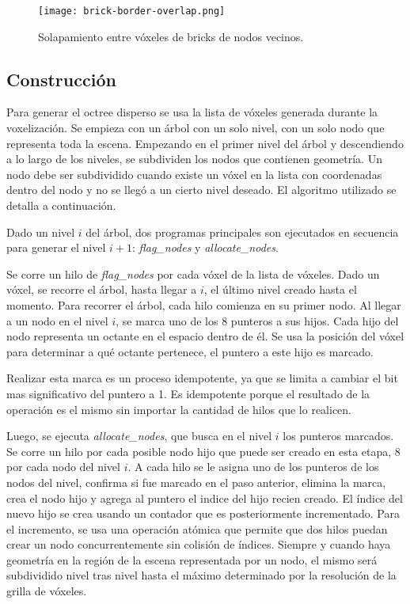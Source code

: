 \begin{figure}[h!]
    \centering
    \texttt{[image: brick-border-overlap.png]}
    \caption{Solapamiento entre vóxeles de bricks de nodos vecinos.}
    \label{fig:brick_border_overlap}
\end{figure}

\subsection{Construcción}\label{design:svo_construction}

Para generar el octree disperso se usa la lista de vóxeles generada durante la voxelización.
Se empieza con un árbol con un solo nivel, con un solo nodo que representa toda la escena.
Empezando en el primer nivel del árbol y descendiendo a lo largo de los niveles, se subdividen los nodos que contienen geometría.
Un nodo debe ser subdividido cuando existe un vóxel en la lista con coordenadas dentro del nodo y no se llegó a un cierto nivel deseado.
El algoritmo utilizado se detalla a continuación.

Dado un nivel $i$ del árbol, dos programas principales son ejecutados en secuencia para generar el nivel $i + 1$: \textit{flag\_nodes} y \textit{allocate\_nodes}.

Se corre un hilo de \textit{flag\_nodes} por cada vóxel de la lista de vóxeles.
Dado un vóxel, se recorre el árbol, hasta llegar a $i$, el último nivel creado hasta el momento.
Para recorrer el árbol, cada hilo comienza en su primer nodo.
Al llegar a un nodo en el nivel $i$, se marca uno de los $8$ punteros a sus hijos.
Cada hijo del nodo representa un octante en el espacio dentro de él.
Se usa la posición del vóxel para determinar a qué octante pertenece, el puntero a este hijo es marcado.

Realizar esta marca es un proceso idempotente, ya que se limita a cambiar el bit mas significativo del puntero a 1.
Es idempotente porque el resultado de la operación es el mismo sin importar la cantidad de hilos que lo realicen.

Luego, se ejecuta \textit{allocate\_nodes}, que busca en el nivel $i$ los punteros marcados. 
Se corre un hilo por cada posible nodo hijo que puede ser creado en esta etapa, $8$ por cada nodo del nivel $i$.
A cada hilo se le asigna uno de los punteros de los nodos del nivel, confirma si fue marcado en el paso anterior, elimina la marca, crea el nodo hijo y agrega al puntero el indice del hijo recien creado.
El índice del nuevo hijo se crea usando un contador que es posteriormente incrementado.
Para el incremento, se usa una operación atómica que permite que dos hilos puedan crear un nodo concurrentemente sin colisión de índices.
Siempre y cuando haya geometría en la región de la escena representada por un nodo, el mismo será subdividido nivel tras nivel hasta el máximo determinado por la resolución de la grilla de vóxeles.

